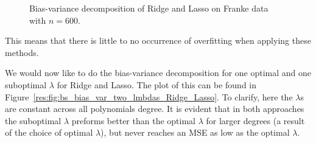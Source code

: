 \documentclass[twocolumn,english,notitlepage]{article}
\begin{document}
\begin{figure}[ht]
\begin{subfigure}{\linewidth}
                \end{subfigure}
                \caption{Bias-variance decomposition of Ridge and Lasso on Franke data with $n=600$.}
                \label{res:fig:bs_bias_var_Ridge_Lasso}
            \end{figure}
            This means that there is little to no occurrence of overfitting when applying these methods.     
        

            We would now like to do the bias-variance decomposition for one optimal and one suboptimal $\lambda$ for Ridge and Lasso. The plot of this can be found in Figure~\ref{res:fig:bs_bias_var_two_lmbdas_Ridge_Lasso}. To clarify, here the $\lambda$s are constant across all polynomials degree. It is evident that in both approaches the suboptimal $\lambda$ preforms better than the optimal $\lambda$ for larger degrees (a result of the choice of optimal $\lambda$), but never reaches an MSE as low as the optimal $\lambda$. 
\end{document}
